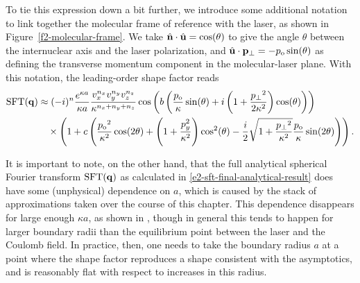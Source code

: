 To tie this expression down a bit further, we introduce some additional notation to link together the molecular frame of reference with the laser, as shown in Figure~\ref{f2-molecular-frame}. We take $\hat{\vb{n}}\cdot\hat{\vb{u}}=\cos(\theta)$ to give the angle $\theta$ between the internuclear axis and the laser polarization, and $\hat{\vb{u}}\cdot{\ensuremath{\vb{p}}_{\perp}}=-{p_\mathrm{o}}\sin(\theta)$ as defining the transverse momentum component in the molecular-laser plane. With this notation, the leading-order shape factor reads
\begin{align}
\sft(\vbq)
& \approx
(-i)^n
\frac{e^{ \kappa a }}{\kappa a}
\frac{ v_x^{n_x}v_y^{\smash[b]{n_y}} v_z^{n_z}}{\kappa^{n_x+n_y+n_z}}
\cos\left(
b \left(
   \frac{\po}{\kappa}\sin(\theta)
   +i \left(1+\frac{\pt^2}{2\kappa^2}\right)\cos(\theta)
 \right)
\right)
%
\nonumber\\ & \quad   \times 
%
\left( 
1 
+ c\left(
  \frac{\po^2}{\kappa^2}\cos(2\theta)
  +\left(1+\frac{p_y^2}{\kappa^2}\right)\cos^2(\theta)
  -\frac{i}{2} \sqrt{1+\frac{\pt^2}{\kappa^2}}\frac{\po}{\kappa}\sin(2\theta)
\right)
\right)
.
\label{e2-leading-asymptotic-sft-molecular}
\end{align}


It is important to note, on the other hand, that the full analytical spherical Fourier transform $\mathrm{SFT}(\vb{q})$ as calculated in \eqref{e2-sft-final-analytical-result} does have some (unphysical) dependence on $a$, which is caused by the stack of approximations taken over the course of this chapter. This dependence disappears for large enough $\kappa a$, as shown in , though in general this tends to happen for larger boundary radii than the equilibrium point between the laser and the Coulomb field. In practice, then, one needs to take the boundary radius $a$ at a point where the shape factor reproduces a shape consistent with the asymptotics, and is reasonably flat with respect to increases in this radius.


\captionsetup[figure]{position=above}

